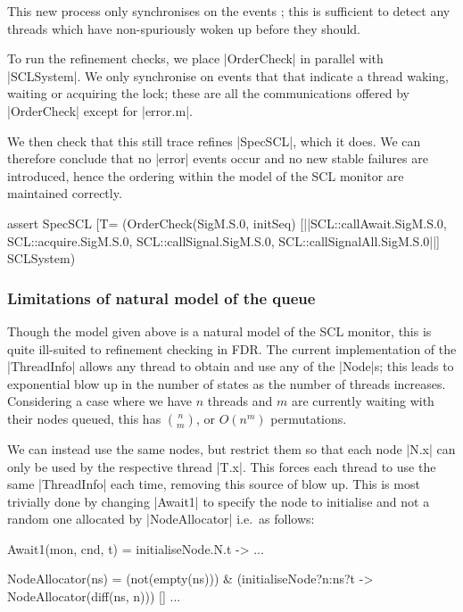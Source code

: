 This new process only synchronises on the events ; this is sufficient to detect any threads which have non-spuriously woken up before they should.

To run the refinement checks, we place |OrderCheck| in parallel with |SCLSystem|. We only synchronise on events that that indicate a thread waking, waiting or acquiring the lock; these are all the communications offered by |OrderCheck| except for |error.m|. 

We then check that this still trace refines |SpecSCL|, which it does. We can therefore conclude that no |error| events occur and no new stable failures are introduced, hence the ordering within the model of the SCL monitor are maintained correctly.

\begin{cspm}
assert SpecSCL [T= (OrderCheck(SigM.S.0, initSeq) 
                     [|{|SCL::callAwait.SigM.S.0,
                         SCL::acquire.SigM.S.0,
                         SCL::callSignal.SigM.S.0,
                         SCL::callSignalAll.SigM.S.0|}|] SCLSystem)
\end{cspm}

\subsubsection{Limitations of natural model of the queue}

Though the model given above is a natural model of the SCL monitor, this is quite ill-suited to refinement checking in FDR. The current implementation of the |ThreadInfo| allows any thread to obtain and use any of the |Node|s; this leads to exponential blow up in the number of states as the number of threads increases. Considering a case where we have $n$ threads and $m$ are currently waiting with their nodes queued, this has $n\choose{m}$, or $O(n^{m})$ permutations.

We can instead use the same nodes, but restrict them so that each node |N.x| can only be used by the respective thread |T.x|. This forces each thread to use the same |ThreadInfo| each time, removing this source of blow up. This is most trivially done by changing |Await1| to specify the node to initialise and not a random one allocated by |NodeAllocator| i.e.~as follows:

\begin{cspm}
  Await1(mon, cnd, t) = initialiseNode.N.t -> ...

  NodeAllocator(ns) = 
      (not(empty(ns))) & (initialiseNode?n:ns?t -> NodeAllocator(diff(ns, {n}))) 
   [] ...
\end{cspm}

